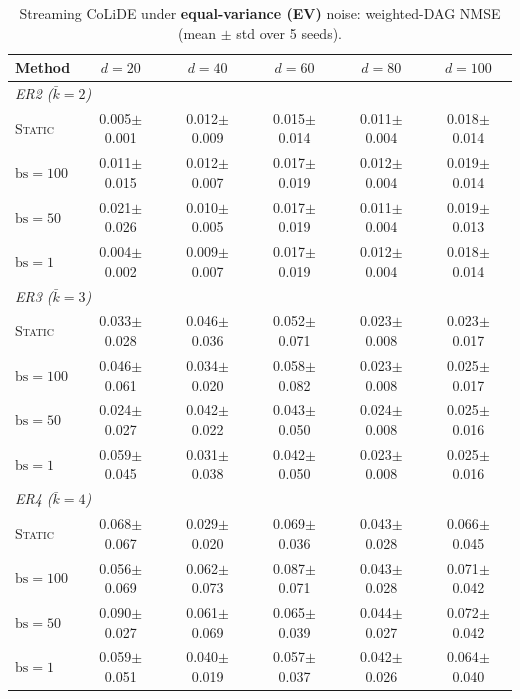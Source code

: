 \begin{table}[t]
\centering
\caption{Streaming CoLiDE under \textbf{equal-variance (EV)} noise:
weighted-DAG NMSE (mean $\pm$ std over 5 seeds).}
\label{tab:sem-ev-nmse}
\setlength{\tabcolsep}{6pt}
\begin{tabular}{l ccccc}
\toprule
\textbf{Method} & $d{=}20$ & $d{=}40$ & $d{=}60$ & $d{=}80$ & $d{=}100$ \\
\midrule
\multicolumn{6}{l}{\textit{ER2  ($\bar{k} = 2$)}} \\
\midrule
\textsc{Static} & 0.005$\pm$0.001 & 0.012$\pm$0.009 & 0.015$\pm$0.014 & 0.011$\pm$0.004 & 0.018$\pm$0.014 \\
$\mathrm{bs}{=}100$ & 0.011$\pm$0.015 & 0.012$\pm$0.007 & 0.017$\pm$0.019 & 0.012$\pm$0.004 & 0.019$\pm$0.014 \\
$\mathrm{bs}{=}50$  & 0.021$\pm$0.026 & 0.010$\pm$0.005 & 0.017$\pm$0.019 & 0.011$\pm$0.004 & 0.019$\pm$0.013 \\
$\mathrm{bs}{=}1$   & 0.004$\pm$0.002 & 0.009$\pm$0.007 & 0.017$\pm$0.019 & 0.012$\pm$0.004 & 0.018$\pm$0.014 \\
\midrule
\multicolumn{6}{l}{\textit{ER3  ($\bar{k} = 3$)}} \\
\midrule
\textsc{Static} & 0.033$\pm$0.028 & 0.046$\pm$0.036 & 0.052$\pm$0.071 & 0.023$\pm$0.008 & 0.023$\pm$0.017 \\
$\mathrm{bs}{=}100$ & 0.046$\pm$0.061 & 0.034$\pm$0.020 & 0.058$\pm$0.082 & 0.023$\pm$0.008 & 0.025$\pm$0.017 \\
$\mathrm{bs}{=}50$  & 0.024$\pm$0.027 & 0.042$\pm$0.022 & 0.043$\pm$0.050 & 0.024$\pm$0.008 & 0.025$\pm$0.016 \\
$\mathrm{bs}{=}1$   & 0.059$\pm$0.045 & 0.031$\pm$0.038 & 0.042$\pm$0.050 & 0.023$\pm$0.008 & 0.025$\pm$0.016 \\
\midrule
\multicolumn{6}{l}{\textit{ER4  ($\bar{k} = 4$)}} \\
\midrule
\textsc{Static} & 0.068$\pm$0.067 & 0.029$\pm$0.020 & 0.069$\pm$0.036 & 0.043$\pm$0.028 & 0.066$\pm$0.045 \\
$\mathrm{bs}{=}100$ & 0.056$\pm$0.069 & 0.062$\pm$0.073 & 0.087$\pm$0.071 & 0.043$\pm$0.028 & 0.071$\pm$0.042 \\
$\mathrm{bs}{=}50$  & 0.090$\pm$0.027 & 0.061$\pm$0.069 & 0.065$\pm$0.039 & 0.044$\pm$0.027 & 0.072$\pm$0.042 \\
$\mathrm{bs}{=}1$   & 0.059$\pm$0.051 & 0.040$\pm$0.019 & 0.057$\pm$0.037 & 0.042$\pm$0.026 & 0.064$\pm$0.040 \\
\bottomrule
\end{tabular}
\end{table}



